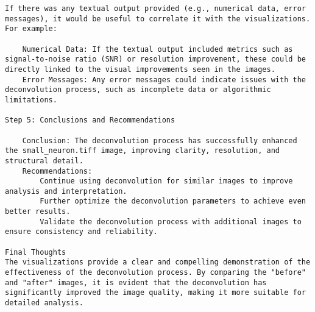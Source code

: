 \begin{lstlisting}
If there was any textual output provided (e.g., numerical data, error messages), it would be useful to correlate it with the visualizations. For example:

    Numerical Data: If the textual output included metrics such as signal-to-noise ratio (SNR) or resolution improvement, these could be directly linked to the visual improvements seen in the images.
    Error Messages: Any error messages could indicate issues with the deconvolution process, such as incomplete data or algorithmic limitations.

Step 5: Conclusions and Recommendations

    Conclusion: The deconvolution process has successfully enhanced the small_neuron.tiff image, improving clarity, resolution, and structural detail.
    Recommendations:
        Continue using deconvolution for similar images to improve analysis and interpretation.
        Further optimize the deconvolution parameters to achieve even better results.
        Validate the deconvolution process with additional images to ensure consistency and reliability.

Final Thoughts
The visualizations provide a clear and compelling demonstration of the effectiveness of the deconvolution process. By comparing the "before" and "after" images, it is evident that the deconvolution has significantly improved the image quality, making it more suitable for detailed analysis.

\end{lstlisting}